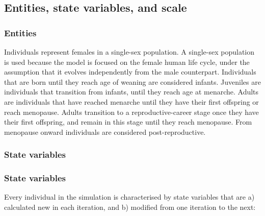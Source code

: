 \documentclass{article}
\begin{document}
\subsection{Entities, state variables, and scale}

\subsubsection{Entities}

Individuals represent females in a single-sex population. A single-sex population is used because the model is focused on the female human life cycle, under the assumption that it evolves independently from the male counterpart. Individuals that are born until they reach age of weaning are considered infants. Juveniles are individuals that transition from infants, until they reach age at menarche. Adults are individuals that have reached menarche until they have their first offspring or reach menopause. Adults transition to a reproductive-career stage once they have their first offspring, and remain in this stage until they reach menopause. From menopause onward individuals are considered post-reproductive.

\subsubsection{State variables}

\subsubsection{State variables}

Every individual in the simulation is characterised by state variables that are a) calculated new in each iteration, and b) modified from one iteration to the next:
\end{document}
